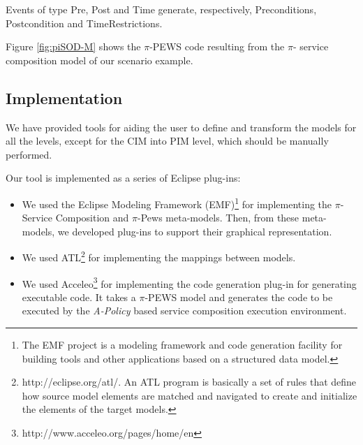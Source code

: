 Events of type {\sf Pre}, {\sf Post} and {\sf Time} generate, respectively, {\sf Preconditions}, {\sf Postcondition} and {\sf TimeRestrictions}.

\begin{example}\label{ex:toPublicMusicT6}
Figure \ref{fig:piSOD-M} shows the $\pi$-PEWS code resulting from the $\pi$- service composition model  of our scenario example.
\end{example}


\subsection{Implementation}
We have provided tools for aiding the user to define and transform the models for all the levels, except for the CIM into PIM level, which should be manually performed.

Our tool is implemented as a series of Eclipse plug-ins: 
\begin{itemize}
\item 	We  used the Eclipse Modeling Framework (EMF)\footnote {The EMF project is a modeling framework and code generation facility for building tools and other applications based on a structured data model.}   for implementing the  $\pi$-Service Composition and $\pi$-{\sc Pews}  meta-models. 
Then, from these meta-models, we  developed plug-ins to support their graphical representation.

\item	 We used  ATL\footnote{http://eclipse.org/atl/. An ATL program is basically a set of rules that define how source model elements are matched and navigated to create and initialize the elements of the target models.}
for implementing the  mappings between models.

\item 	We  used Acceleo\footnote{http://www.acceleo.org/pages/home/en} for implementing  the code generation plug-in for generating executable code. 
It takes a $\pi$-PEWS model and generates the code to be executed by the {\em
A-Policy} based service composition execution environment.
\end{itemize}

